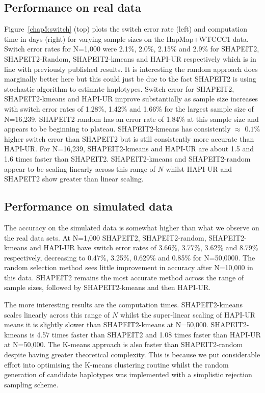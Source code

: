 \subsection{Performance on real data}
Figure~\ref{chap5:switch} (top) plots the switch error rate (left) and computation time in days (right) for varying sample sizes on the HapMap+WTCCC1 data. Switch error rates for N=1,000 were  2.1\%, 2.0\%, 2.15\% and 2.9\% for SHAPEIT2, SHAPEIT2-Random, SHAPEIT2-kmeans and HAPI-UR respectively which is in line with previously published results. It is interesting the random approach does marginally better here but this could just be due to the fact SHAPEIT2 is using stochastic algorithm to estimate haplotypes. Switch error for SHAPEIT2, SHAPEIT2-kmeans and HAPI-UR improve substantially as sample size increases with switch error rates of 1.28\%, 1.42\% and 1.66\% for the largest sample size of N=16,239.   SHAPEIT2-random has an error rate of 1.84\% at this sample size and appears to be beginning to plateau. SHAPEIT2-kmeans has consistently $\approx$ $0.1\%$ higher switch error than SHAPEIT2 but is still consistently more accurate than HAPI-UR.   For N=16,239, SHAPEIT2-kmeans and HAPI-UR are about 1.5 and 1.6 times faster than SHAPEIT2.  SHAPEIT2-kmeans and SHAPEIT2-random appear to be scaling linearly across this range of $N$ whilst HAPI-UR and SHAPEIT2 show greater than linear scaling.

\subsection{Performance on simulated data}
The accuracy on the simulated data is somewhat higher than what we observe on the real data sets.  At N=1,000 SHAPEIT2, SHAPEIT2-random, SHAPEIT2-kmeans and HAPI-UR  have switch error rates of 3.66\%, 3.77\%, 3.62\% and 8.79\% respectively, decreasing to  0.47\%,  3.25\%, 0.629\%  and  0.85\% for N=50,0000. The random selection method sees little improvement in accuracy after N=10,000 in this data.  SHAPEIT2 remains the most accurate method across the range of sample sizes, followed by SHAPEIT2-kmeans and then HAPI-UR.

The more interesting results are the computation times.  SHAPEIT2-kmeans scales linearly across this range of $N$ whilst the super-linear scaling of HAPI-UR  means it is slightly slower than SHAPEIT2-kmeans at N=50,000.  SHAPEIT2-kmeans is 4.57 times faster than SHAPEIT2 and 1.08 times faster than HAPI-UR  at N=50,000.  The K-means approach is also faster than SHAPEIT2-random despite having greater theoretical complexity.  This is because we put considerable effort into optimising the K-means clustering routine whilst the random generation of candidate haplotypes was implemented with a simplistic rejection sampling scheme. 

